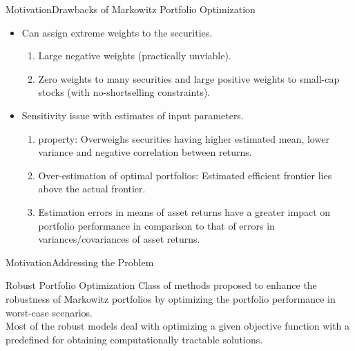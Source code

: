 \documentclass{beamer}
\begin{document}
\begin{frame}{Motivation}{Drawbacks of Markowitz Portfolio Optimization}
\begin{itemize}
    \item {Can assign extreme weights to the securities.
    \begin{enumerate}
        \item{Large negative weights (practically unviable).}
        \item{Zero weights to many securities and large positive weights to small-cap stocks (with no-shortselling constraints).}\\
    \end{enumerate} 
    }
    \item {Sensitivity issue with estimates of input parameters.
    \begin{enumerate}
        \item { property: Overweighs securities having higher estimated mean, lower variance and negative correlation between returns.}
        \item{ Over-estimation of optimal portfolios: Estimated efficient frontier lies above the actual frontier.}
        \item{ Estimation errors in means of asset returns have a greater impact on portfolio performance in comparison to that of errors in variances/covariances of asset returns.}
    \end{enumerate}
    }
\end{itemize}
\end{frame}


\begin{frame}{Motivation}{Addressing the Problem}

\begin{block}{Robust Portfolio Optimization}
Class of methods proposed to enhance the robustness of Markowitz portfolios by optimizing the portfolio performance in worst-case scenarios.\\
Most of the robust models deal with optimizing a given objective function with a predefined  for obtaining computationally tractable solutions.
\end{block}
\end{frame}
\end{document}
